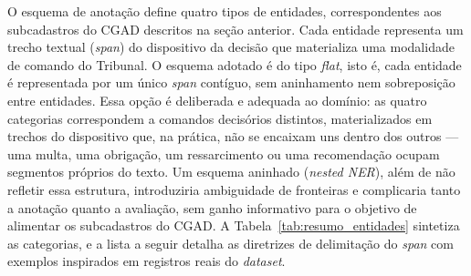 O esquema de anotação define quatro tipos de entidades, correspondentes aos subcadastros do CGAD descritos na seção anterior. Cada entidade representa um trecho textual (\textit{span}) do dispositivo da decisão que materializa uma modalidade de comando do Tribunal. O esquema adotado é do tipo \emph{flat}, isto é, cada entidade é representada por um único \textit{span} contíguo, sem aninhamento nem sobreposição entre entidades. Essa opção é deliberada e adequada ao domínio: as quatro categorias correspondem a comandos decisórios distintos, materializados em trechos do dispositivo que, na prática, não se encaixam uns dentro dos outros --- uma multa, uma obrigação, um ressarcimento ou uma recomendação ocupam segmentos próprios do texto. Um esquema aninhado (\textit{nested NER}), além de não refletir essa estrutura, introduziria ambiguidade de fronteiras e complicaria tanto a anotação quanto a avaliação, sem ganho informativo para o objetivo de alimentar os subcadastros do CGAD. A Tabela~\ref{tab:resumo_entidades} sintetiza as categorias, e a lista a seguir detalha as diretrizes de delimitação do \textit{span} com exemplos inspirados em registros reais do \textit{dataset}.

